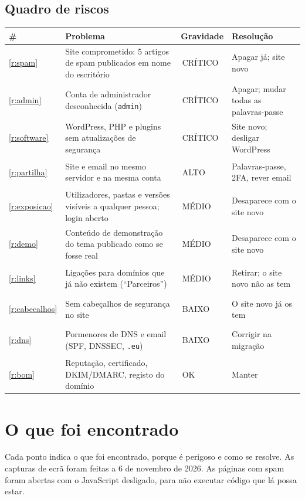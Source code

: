 \documentclass[11pt,a4paper]{article}
\newcommand{\sev}[2]{\colorbox{#1}{\color{white}\footnotesize\bfseries\strut\,#2\,}}
\newcommand{\critico}{\sev{critico}{CRÍTICO}}
\newcommand{\altoo}{\sev{alto}{ALTO}}
\newcommand{\medio}{\sev{medio}{MÉDIO}}
\newcommand{\baixo}{\sev{baixo}{BAIXO}}
\newcommand{\okk}{\sev{ok}{OK}}
\begin{document}
\subsection*{Quadro de riscos}
\renewcommand{\arraystretch}{1.25}
\begin{longtable}{@{}p{0.75cm}p{7.15cm}p{2.2cm}p{4.6cm}@{}}
\toprule
\textbf{\#} & \textbf{Problema} & \textbf{Gravidade} & \textbf{Resolução} \\ \midrule
\endhead
\ref{r:spam} & Site comprometido: 5 artigos de spam publicados em nome do escritório & \critico & Apagar já; site novo \\
\ref{r:admin} & Conta de administrador desconhecida (\texttt{admin}) & \critico & Apagar; mudar todas as palavras-passe \\
\ref{r:software} & WordPress, PHP e plugins sem atualizações de segurança & \critico & Site novo; desligar WordPress \\
\ref{r:partilha} & Site e email no mesmo servidor e na mesma conta & \altoo & Palavras-passe, 2FA, rever email \\
\ref{r:exposicao} & Utilizadores, pastas e versões visíveis a qualquer pessoa; login aberto & \medio & Desaparece com o site novo \\
\ref{r:demo} & Conteúdo de demonstração do tema publicado como se fosse real & \medio & Desaparece com o site novo \\
\ref{r:links} & Ligações para domínios que já não existem (``Parceiros'') & \medio & Retirar; o site novo não as tem \\
\ref{r:cabecalhos} & Sem cabeçalhos de segurança no site & \baixo & O site novo já os tem \\
\ref{r:dns} & Pormenores de DNS e email (SPF, DNSSEC, \texttt{.eu}) & \baixo & Corrigir na migração \\
\ref{r:bom} & Reputação, certificado, DKIM/DMARC, registo do domínio & \okk & Manter \\
\bottomrule
\end{longtable}

\section{O que foi encontrado}
\label{sec:achados}

Cada ponto indica o que foi encontrado, porque é perigoso e como se resolve. As capturas de ecrã foram
feitas a 6 de novembro de 2026. As páginas com spam foram abertas com o JavaScript desligado, para não
executar código que lá possa estar.
\end{document}

